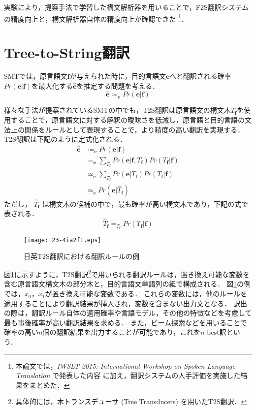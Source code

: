 \documentclass[japanese]{jnlp_1.4}
\newcommand{\argmax}{}
\begin{document}
実験により，提案手法で学習した構文解析器を用いることで，F2S翻訳システムの精度向上と，構文解析器自体の精度向上が確認できた
\footnote{本論文では，\textit{IWSLT 2015: International Workshop on Spoken Language Translation} で発表した内容 \cite{morishita15iwslt} に加え，翻訳システムの人手評価を実施した結果をまとめた．
}．


\section{Tree-to-String翻訳}
\label{sec:t2s_mt}

SMTでは，原言語文$\bm{f}$が与えられた時に，目的言語文$\bm{e}$へと翻訳される確率$Pr(\bm{e}|\bm{f})$を最大化する$\hat{\bm{e}}$を推定する問題を考える．
\begin{equation}
\hat{\bm{e}}\coloneqq \argmax_{\bm{e}} Pr(\bm{e}|\bm{f})
\end{equation}

様々な手法が提案されているSMTの中でも，T2S翻訳は原言語文の構文木$T_{\bm{f}}$を使用することで，原言語文に対する解釈の曖昧さを低減し，原言語と目的言語の文法上の関係をルールとして表現することで，より精度の高い翻訳を実現する．
T2S翻訳は下記のように定式化される．
\begin{align}
\hat{\bm{e}}&\coloneqq \argmax_{\bm{e}} Pr(\bm{e}|\bm{f}) \\
&=\argmax_{\bm{e}} \sum_{T_{\bm{f}}} Pr(\bm{e}|\bm{f},T_{\bm{f}}) Pr(T_{\bm{f}}|\bm{f}) \\
&\simeq \argmax_{\bm{e}} \sum_{T_{\bm{f}}} Pr(\bm{e}|T_{\bm{f}}) Pr(T_{\bm{f}}|\bm{f}) \\
&\simeq \argmax_{\bm{e}} Pr(\bm{e}|\hat{T}_{\bm{f}})
\end{align}
ただし， $\hat{T}_{\bm{f}}$ は構文木の候補の中で，最も確率が高い構文木であり，下記の式で表される．
\begin{equation}
\label{eq:best_tree}
\hat{T}_{\bm{f}} = \argmax_{T_{\bm{f}}} Pr(T_{\bm{f}}|\bm{f})
\end{equation}

\begin{figure}[b]
\begin{center}
\texttt{[image: 23-4ia2f1.eps]}
\end{center}
\caption{日英T2S翻訳における翻訳ルールの例}
\label{fig:t2s_example}
\vspace{-1\Cvs}
\end{figure}

図\ref{fig:t2s_example}に示すように，T2S翻訳\footnote{具体的には，木トランスデューサ (Tree Transducers) を用いたT2S翻訳．}で用いられる翻訳ルールは，置き換え可能な変数を含む原言語文構文木の部分木と，目的言語文単語列の組で構成される．
図\ref{fig:t2s_example}の例では，$x_{0}$，$x_{1}$が置き換え可能な変数である．
これらの変数には，他のルールを適用することにより翻訳結果が挿入され，変数を含まない出力文となる．
訳出の際は，翻訳ルール自体の適用確率や言語モデル，その他の特徴などを考慮して最も事後確率が高い翻訳結果を求める．
また，ビーム探索などを用いることで確率の高い$n$個の翻訳結果を出力することが可能であり，これを$n$-best訳という．
\end{document}
